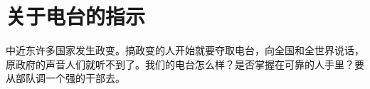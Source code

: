 \section[关于电台的指示（一九六二年十月一日）]{关于电台的指示}


中近东许多国家发生政变。搞政变的人开始就要夺取电台，向全国和全世界说话，原政府的声音人们就听不到了。我们的电台怎么样？是否掌握在可靠的人手里？要从部队调一个强的干部去。

